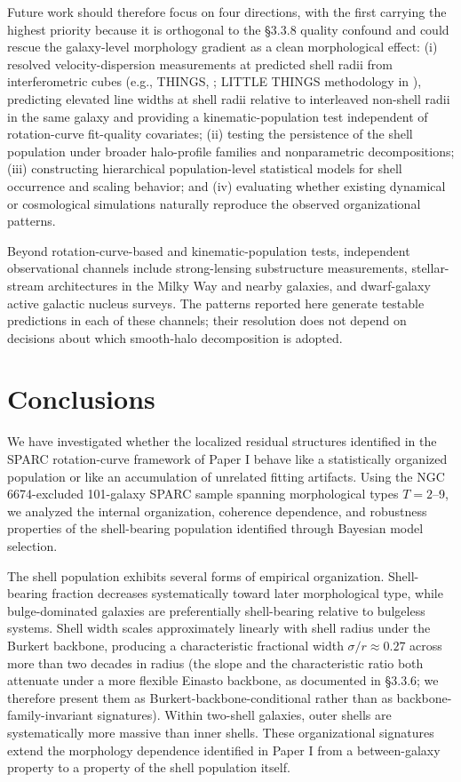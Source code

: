 \documentclass[linenumbers,trackchanges]{aastex701}
\begin{document}
Future work should therefore focus on four directions, with the first carrying the highest priority because it is orthogonal to the \S3.3.8 quality confound and could rescue the galaxy-level morphology gradient as a clean morphological effect: (i) resolved  velocity-dispersion measurements at predicted shell radii from interferometric cubes (e.g., THINGS, \citealt{Walter2008}; LITTLE THINGS methodology in \citealt{Oh2011}), predicting elevated line widths at shell radii relative to interleaved non-shell radii in the same galaxy and providing a kinematic-population test independent of rotation-curve fit-quality covariates; (ii) testing the persistence of the shell population under broader halo-profile families and nonparametric decompositions; (iii) constructing hierarchical population-level statistical models for shell occurrence and scaling behavior; and (iv) evaluating whether existing dynamical or cosmological simulations naturally reproduce the observed organizational patterns.

Beyond rotation-curve-based and kinematic-population tests, independent observational channels include strong-lensing substructure measurements, stellar-stream architectures in the Milky Way and nearby galaxies, and dwarf-galaxy active galactic nucleus surveys. The patterns reported here generate testable predictions in each of these channels; their resolution does not depend on decisions about which smooth-halo decomposition is adopted.

\section{Conclusions}

We have investigated whether the localized residual structures identified in the SPARC rotation-curve framework of Paper I behave like a statistically organized population or like an accumulation of unrelated fitting artifacts. Using the NGC 6674-excluded 101-galaxy SPARC sample spanning morphological types $T = 2$--9, we analyzed the internal organization, coherence dependence, and robustness properties of the shell-bearing population identified through Bayesian model selection.

The shell population exhibits several forms of empirical organization. Shell-bearing fraction decreases systematically toward later morphological type, while bulge-dominated galaxies are preferentially shell-bearing relative to bulgeless systems. Shell width scales approximately linearly with shell radius under the Burkert backbone, producing a characteristic fractional width $\sigma/r \approx 0.27$ across more than two decades in radius (the slope and the characteristic ratio both attenuate under a more flexible Einasto backbone, as documented in \S3.3.6; we therefore present them as Burkert-backbone-conditional rather than as backbone-family-invariant signatures). Within two-shell galaxies, outer shells are systematically more massive than inner shells. These organizational signatures extend the morphology dependence identified in Paper I from a between-galaxy property to a property of the shell population itself.
\end{document}
